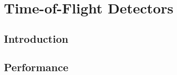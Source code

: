 \graphicspath{{02-TOF/Figures/}}

\section{Time-of-Flight Detectors}
\label{Sect:TOF}

\subsection{Introduction}
\label{SubSect:TOF_Intro}

\subsection{Performance}
\label{SubSect:TOF_Performance}
